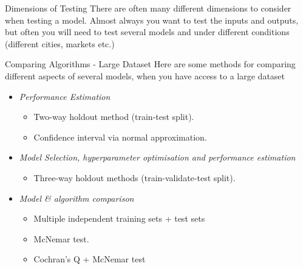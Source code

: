 \documentclass[11pt,a4paper]{article}
\begin{document}
  \begin{proposition}{Dimensions of Testing}
    There are often many different dimensions to consider when testing a model. Almost always you want to test the inputs and outputs, but often you will need to test several models and under different conditions (different cities, markets etc.)
  \end{proposition}

  \begin{proposition}{Comparing Algorithms - Large Dataset}
    Here are some methods for comparing different aspects of several models, when you have access to a large dataset
    \begin{itemize}
      \item \textit{Performance Estimation}
      \begin{itemize}
        \item Two-way holdout method (train-test split).
        \item Confidence interval via normal approximation.
      \end{itemize}
      \item \textit{Model Selection, hyperparameter optimisation and performance estimation}
      \begin{itemize}
        \item Three-way holdout methods (train-validate-test split).
      \end{itemize}
      \item \textit{Model \& algorithm comparison}
      \begin{itemize}
        \item Multiple independent training sets + test sets
        \item McNemar test.
        \item Cochran's Q + McNemar test
      \end{itemize}
    \end{itemize}
  \end{proposition}
\end{document}
